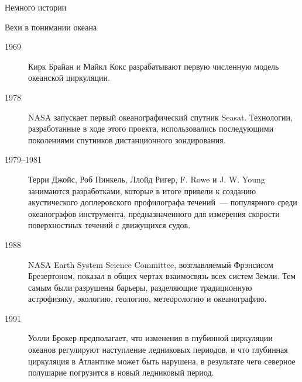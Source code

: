 \begin{chapter}{Немного истории}
\begin{section}{Вехи в понимании океана}
\begin{description}
\item[1969] Кирк Брайан и Майкл Кокс разрабатывают первую численную
модель океанской циркуляции.
%

\item[1978] NASA запускает первый океанографический спутник Seasat. 
Технологии, разработанные в ходе этого проекта, использовались последующими
поколениями спутников дистанционного зондирования.
%

\item[1979--1981] Терри Джойс, Роб Пинкель, Ллойд Ригер, F. Rowe и
J. W. Young занимаются разработками, которые в итоге привели к созданию
акустического доплеровского профилографа течений~--- популярного среди
океанографов инструмента, предназначенного для измерения скорости 
поверхностных течений с движущихся судов.
%

\item[1988] NASA Earth System Science Committee, возглавляемый
Фрэнсисом Брезертоном, показал в общих чертах взаимосвязь всех систем Земли.
Тем самым были разрушены барьеры, разделяющие традиционную астрофизику, 
экологию, геологию, метеорологию и океанографию.
%

\item[1991] Уолли Брокер предполагает, что изменения в глубинной
циркуляции океанов регулируют наступление ледниковых периодов, и что
глубинная циркуляция в Атлантике может быть нарушена, в результате чего
северное полушарие погрузится в новый ледниковый период.
%


\end{description}
\end{section}
\end{chapter}

